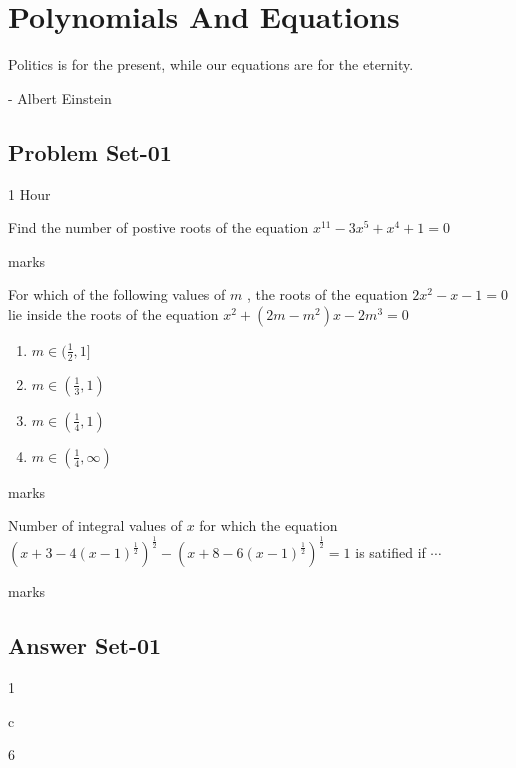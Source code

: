 
\chapter[]{ Polynomials And Equations}
\epigraph{Politics is for the present, while our equations are for the eternity.}{- Albert Einstein}

\section[Problem Set-01]{Problem Set-01}
\begin{flushright}1 Hour\end{flushright}

\begin{problem}
Find the number of postive roots of the equation $ x^{11} - 3 x^5 + x^4 + 1 = 0$\begin{flushright}[4] marks\end{flushright}
\end{problem}

\begin{problem}
For which of the following values of $ m $ , the roots of the equation $ 2x^2 - x - 1 = 0$ lie inside the roots of the equation $x^2 + (2m - m^2)x - 2m^3 = 0$ \
\begin{enumerate} [label=(\alph*)]
\item $ m \in (\frac{1}{2}, 1]$
\item $ m \in (\frac{1}{3}, 1)$
\item $ m \in (\frac{1}{4}, 1)$
\item $ m \in (\frac{1}{4}, \infty)$
\end{enumerate}
\begin{flushright}[6, -1] marks\end{flushright}
\end{problem}

\begin{problem}
Number of integral values of $x$ for which the equation
$(x+3 - 4(x-1)^{\frac{1}{2}})^{\frac{1}{2}} - (x+8 - 6(x-1)^{\frac{1}{2}})^{\frac{1}{2}} = 1$ is satified if $\cdots$ \

\begin{flushright}[6] marks\end{flushright}
\end{problem}

\section[Answer Set-01]{Answer Set-01}
\begin{answer}
1
\end{answer}
\begin{answer}
c
\end{answer}
\begin{answer}
6
\end{answer}



